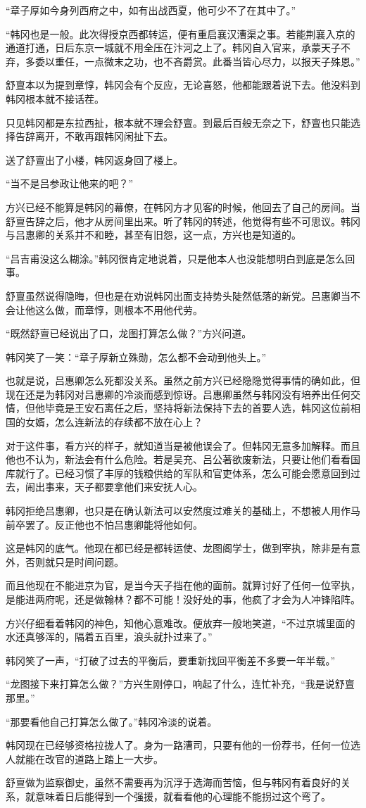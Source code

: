 “章子厚如今身列西府之中，如有出战西夏，他可少不了在其中了。”

“韩冈也是一般。此次得授京西都转运，便有重启襄汉漕渠之事。若能荆襄入京的通道打通，日后东京一城就不用全压在汴河之上了。韩冈自入官来，承蒙天子不弃，多委以重任，一点微末之功，也不吝爵赏。此番当皆心尽力，以报天子殊恩。”

舒亶本以为提到章惇，韩冈会有个反应，无论喜怒，他都能跟着说下去。他没料到韩冈根本就不接话茬。

只见韩冈都是东拉西扯，根本就不理会舒亶。到最后百般无奈之下，舒亶也只能选择告辞离开，不敢再跟韩冈闲扯下去。

送了舒亶出了小楼，韩冈返身回了楼上。

“当不是吕参政让他来的吧？”

方兴已经不能算是韩冈的幕僚，在韩冈方才见客的时候，他回去了自己的房间。当舒亶告辞之后，他才从房间里出来。听了韩冈的转述，他觉得有些不可思议。韩冈与吕惠卿的关系并不和睦，甚至有旧怨，这一点，方兴也是知道的。

“吕吉甫没这么糊涂。”韩冈很肯定地说着，只是他本人也没能想明白到底是怎么回事。

舒亶虽然说得隐晦，但也是在劝说韩冈出面支持势头陡然低落的新党。吕惠卿当不会让他这么做，而章惇，则根本不用他代劳。

“既然舒亶已经说出了口，龙图打算怎么做？”方兴问道。

韩冈笑了一笑：“章子厚新立殊勋，怎么都不会动到他头上。”

也就是说，吕惠卿怎么死都没关系。虽然之前方兴已经隐隐觉得事情的确如此，但现在还是为韩冈对吕惠卿的冷淡而感到惊讶。吕惠卿虽然与韩冈没有培养出任何交情，但他毕竟是王安石离任之后，坚持将新法保持下去的首要人选，韩冈这位前相国的女婿，怎么连新法的存续都不放在心上？

对于这件事，看方兴的样子，就知道当是被他误会了。但韩冈无意多加解释。而且他也不认为，新法会有什么危险。若是吴充、吕公著欲废新法，只要让他们看看国库就行了。已经习惯了丰厚的钱粮供给的军队和官吏体系，怎么可能会愿意回到过去，闹出事来，天子都要拿他们来安抚人心。

韩冈拒绝吕惠卿，也只是在确认新法可以安然度过难关的基础上，不想被人用作马前卒罢了。反正他也不怕吕惠卿能将他如何。

这是韩冈的底气。他现在都已经是都转运使、龙图阁学士，做到宰执，除非是有意外，否则就只是时间问题。

而且他现在不能进京为官，是当今天子挡在他的面前。就算讨好了任何一位宰执，是能进两府呢，还是做翰林？都不可能！没好处的事，他疯了才会为人冲锋陷阵。

方兴仔细看着韩冈的神色，知他心意难改。便放弃一般地笑道，“不过京城里面的水还真够浑的，隔着五百里，浪头就扑过来了。”

韩冈笑了一声，“打破了过去的平衡后，要重新找回平衡差不多要一年半载。”

“龙图接下来打算怎么做？”方兴生刚停口，响起了什么，连忙补充，“我是说舒亶那里。”

“那要看他自己打算怎么做了。”韩冈冷淡的说着。

韩冈现在已经够资格拉拢人了。身为一路漕司，只要有他的一份荐书，任何一位选人就能在改官的道路上踏上一大步。

舒亶做为监察御史，虽然不需要再为沉浮于选海而苦恼，但与韩冈有着良好的关系，就意味着日后能得到一个强援，就看看他的心理能不能拐过这个弯了。

